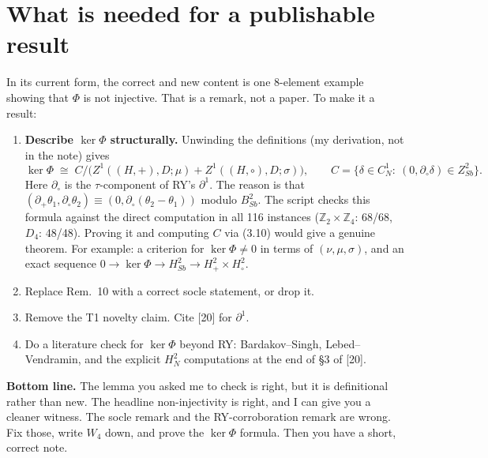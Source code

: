 \documentclass[11pt]{article}
\newcommand{\Z}{\mathbb{Z}}
\begin{document}
\section*{What is needed for a publishable result}
In its current form, the correct and new content is one 8-element example showing that
$\Phi$ is not injective. That is a remark, not a paper. To make it a result:
\begin{enumerate}[leftmargin=*]
\item \textbf{Describe $\ker\Phi$ structurally.} Unwinding the definitions (my derivation,
  not in the note) gives
  \[
  \ker\Phi\;\cong\;C\big/\bigl(Z^1((H,+),D;\mu)+Z^1((H,\circ),D;\sigma)\bigr),
  \qquad C=\{\delta\in C^1_N:\ (0,\partial_\circ\delta)\in Z^2_{Sb}\}.
  \]
  Here $\partial_\circ$ is the $\tau$-component of RY's $\partial^1$. The reason is that
  $(\partial_+\theta_1,\partial_\circ\theta_2)\equiv(0,\partial_\circ(\theta_2-\theta_1))$
  modulo $B^2_{Sb}$. The script checks this formula against the direct computation in all
  116 instances ($\Z_2\times\Z_4$: 68/68, $D_4$: 48/48). Proving it and computing $C$ via
  (3.10) would give a genuine theorem. For example: a criterion for $\ker\Phi\neq0$ in terms
  of $(\nu,\mu,\sigma)$, and an exact sequence
  $0\to\ker\Phi\to H^2_{Sb}\to H^2_+\times H^2_\circ$.
\item Replace Rem.~10 with a correct socle statement, or drop it.
\item Remove the T1 novelty claim. Cite [20] for $\partial^1$.
\item Do a literature check for $\ker\Phi$ beyond RY: Bardakov--Singh, Lebed--Vendramin,
  and the explicit $H^2_N$ computations at the end of \S3 of [20].
\end{enumerate}

\noindent\textbf{Bottom line.} The lemma you asked me to check is right, but it is
definitional rather than new. The headline non-injectivity is right, and I can give you a
cleaner witness. The socle remark and the RY-corroboration remark are wrong. Fix those,
write $W_4$ down, and prove the $\ker\Phi$ formula. Then you have a short, correct note.
\end{document}
